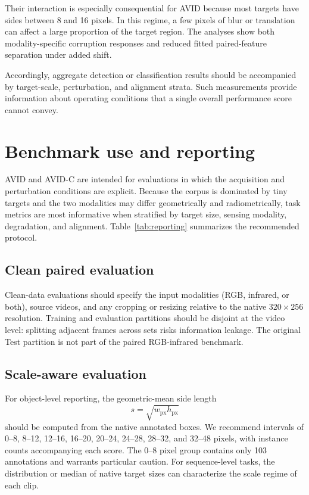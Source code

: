 \documentclass[10pt]{article}
\newcommand{\dataset}{\textsc{AVID}}
\newcommand{\corrupt}{\textsc{AVID-C}}
\begin{document}
Their interaction is especially consequential for \dataset{} because most targets have sides between 8 and 16 pixels. In this regime, a few pixels of blur or translation can affect a large proportion of the target region. The analyses show both modality-specific corruption responses and reduced fitted paired-feature separation under added shift.

Accordingly, aggregate detection or classification results should be accompanied by target-scale, perturbation, and alignment strata. Such measurements provide information about operating conditions that a single overall performance score cannot convey.

\section{Benchmark use and reporting}
\label{sec:protocol}

\dataset{} and \corrupt{} are intended for evaluations in which the acquisition and perturbation conditions are explicit. Because the corpus is dominated by tiny targets and the two modalities may differ geometrically and radiometrically, task metrics are most informative when stratified by target size, sensing modality, degradation, and alignment. Table~\ref{tab:reporting} summarizes the recommended protocol.

\subsection{Clean paired evaluation}

Clean-data evaluations should specify the input modalities (RGB, infrared, or both), source videos, and any cropping or resizing relative to the native $320\times256$ resolution. Training and evaluation partitions should be disjoint at the video level: splitting adjacent frames across sets risks information leakage. The original Test partition is not part of the paired RGB-infrared benchmark.

\subsection{Scale-aware evaluation}

For object-level reporting, the geometric-mean side length
\begin{equation}
s=\sqrt{w_{\mathrm{px}}h_{\mathrm{px}}}
\end{equation}
should be computed from the native annotated boxes. We recommend intervals of 0--8, 8--12, 12--16, 16--20, 20--24, 24--28, 28--32, and 32--48 pixels, with instance counts accompanying each score. The 0--8 pixel group contains only 103 annotations and warrants particular caution. For sequence-level tasks, the distribution or median of native target sizes can characterize the scale regime of each clip.
\end{document}
